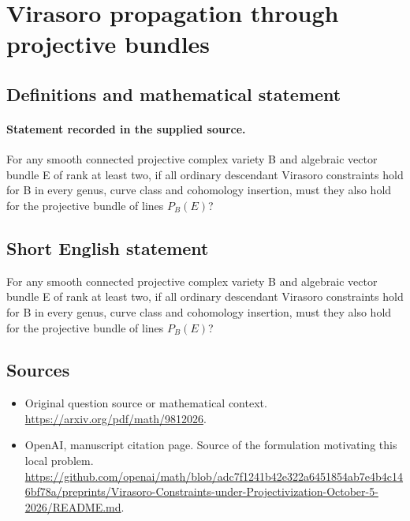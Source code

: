 \documentclass[11pt]{article}
\begin{document}
\section*{Virasoro propagation through projective bundles}\label{30007077}
\subsection{Definitions and mathematical statement}
\paragraph{Statement recorded in the supplied source.}
For any smooth connected projective complex variety B and algebraic vector bundle E of rank at least two, if all ordinary descendant Virasoro constraints hold for B in every genus, curve class and cohomology insertion, must they also hold for the projective bundle of lines $P_B(E)$?
\subsection{Short English statement}
For any smooth connected projective complex variety B and algebraic vector bundle E of rank at least two, if all ordinary descendant Virasoro constraints hold for B in every genus, curve class and cohomology insertion, must they also hold for the projective bundle of lines $P_B(E)$?
\subsection{Sources}
\begin{itemize}
\item[S1] Original question source or mathematical context.
\url{https://arxiv.org/pdf/math/9812026}.
\item[S2] OpenAI, manuscript citation page. Source of the formulation motivating this local problem.
\url{https://github.com/openai/math/blob/adc7f1241b42e322a6451854ab7e4b4c146bf78a/preprints/Virasoro-Constraints-under-Projectivization-October-5-2026/README.md}.
\end{itemize}
\end{document}
